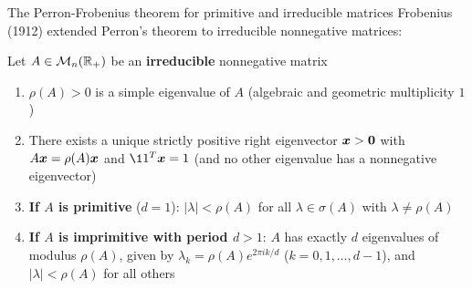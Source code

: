 \documentclass[aspectratio=169]{beamer}\usepackage[]{graphicx}\usepackage[]{xcolor}
\begin{document}
\begin{frame}{The Perron-Frobenius theorem for primitive and irreducible matrices}
Frobenius (1912) extended Perron's theorem to irreducible nonnegative matrices:
\begin{theorem}
\label{th:perron-frobenius}
Let $A \in \mathcal{M}_n(\mathbb{R}_+)$ be an \textbf{irreducible} nonnegative matrix
\begin{enumerate}
\item $\rho(A) > 0$ is a simple eigenvalue of $A$ (algebraic and geometric multiplicity $1$)
\item There exists a unique strictly positive right eigenvector $\bx > \b0$ with $A\bm{x} = \rho(A)\bm{x}$ and $\11^T\bx = 1$ (and no other eigenvalue has a nonnegative eigenvector)
\item \textbf{If $A$ is primitive} ($d = 1$): $|\lambda| < \rho(A)$ for all $\lambda \in \sigma(A)$ with $\lambda \neq \rho(A)$
\item \textbf{If $A$ is imprimitive with period $d > 1$}: $A$ has exactly $d$ eigenvalues of modulus $\rho(A)$, given by $\lambda_k = \rho(A) e^{2\pi i k / d}$ ($k = 0, 1, \ldots, d-1$), and $|\lambda| < \rho(A)$ for all others
\end{enumerate}
\end{theorem}
\end{frame}
\end{document}
